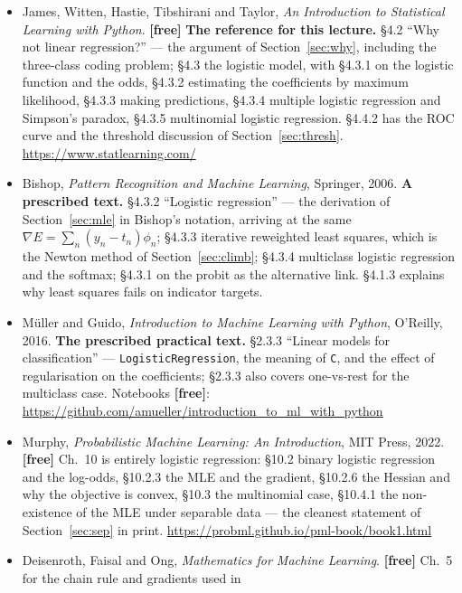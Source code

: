 \documentclass[11pt]{article}
\begin{document}
\begin{itemize}[leftmargin=*]
  \item James, Witten, Hastie, Tibshirani and Taylor, \emph{An Introduction to
    Statistical Learning with Python}. \textbf{[free]} \textbf{The reference
    for this lecture.} §4.2 ``Why not linear regression?'' --- the argument of
    Section~\ref{sec:why}, including the three-class coding problem; §4.3 the
    logistic model, with §4.3.1 on the logistic function and the odds, §4.3.2
    estimating the coefficients by maximum likelihood, §4.3.3 making
    predictions, §4.3.4 multiple logistic regression and Simpson's paradox,
    §4.3.5 multinomial logistic regression. §4.4.2 has the ROC curve and the
    threshold discussion of Section~\ref{sec:thresh}.
    \url{https://www.statlearning.com/}
  \item Bishop, \emph{Pattern Recognition and Machine Learning}, Springer,
    2006. \textbf{A prescribed text.} §4.3.2 ``Logistic regression'' --- the
    derivation of Section~\ref{sec:mle} in Bishop's notation, arriving at the
    same $\nabla E = \sum_n (y_n - t_n)\phi_n$; §4.3.3 iterative reweighted
    least squares, which is the Newton method of Section~\ref{sec:climb};
    §4.3.4 multiclass logistic regression and the softmax; §4.3.1 on the
    probit as the alternative link. §4.1.3 explains why least squares fails on
    indicator targets.
  \item M\"uller and Guido, \emph{Introduction to Machine Learning with
    Python}, O'Reilly, 2016. \textbf{The prescribed practical text.} §2.3.3
    ``Linear models for classification'' --- \texttt{LogisticRegression},
    the meaning of \texttt{C}, and the effect of regularisation on the
    coefficients; §2.3.3 also covers one-vs-rest for the multiclass case.
    Notebooks \textbf{[free]}:
    \url{https://github.com/amueller/introduction_to_ml_with_python}
  \item Murphy, \emph{Probabilistic Machine Learning: An Introduction}, MIT
    Press, 2022. \textbf{[free]} Ch.~10 is entirely logistic regression: §10.2
    binary logistic regression and the log-odds, §10.2.3 the MLE and the
    gradient, §10.2.6 the Hessian and why the objective is convex, §10.3 the
    multinomial case, §10.4.1 the non-existence of the MLE under separable
    data --- the cleanest statement of Section~\ref{sec:sep} in print.
    \url{https://probml.github.io/pml-book/book1.html}
  \item Deisenroth, Faisal and Ong, \emph{Mathematics for Machine Learning}.
    \textbf{[free]} Ch.~5 for the chain rule and gradients used in

\end{itemize}
\end{document}
